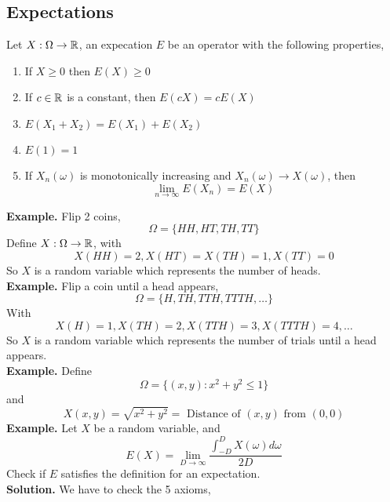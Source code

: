 \subsection{Expectations}
\begin{definition}
    
    Let $X: \Omega \to \mathbb{R}$, an expecation $E$ be an operator with the following properties, 
    \begin{enumerate}[label=(\roman*)]
        \item If $X \geq 0$ then $E(X) \geq 0$
        \item If $c \in \mathbb{R}$ is a constant, then $E(cX) = cE(X)$
        \item $E(X_1 + X_2) = E(X_1) + E(X_2)$
        \item $E(1) = 1$
        \item If $X_n(\omega)$ is monotonically increasing and $X_n(\omega) \rightarrow X(\omega)$, then 
        \[\lim_{n\rightarrow \infty} E(X_n) = E(X)\]
    \end{enumerate}
\end{definition}
\noindent
\textbf{Example.} Flip 2 coins, 
\[\Omega = \{HH, HT, TH, TT\}\]
Define $X: \Omega \rightarrow \mathbb{R}$, with 
\[X(HH) = 2, X(HT) = X(TH) = 1, X(TT) = 0\]
So $X$ is a random variable which represents the number of heads.\\[2ex]
\textbf{Example.} Flip a coin until a head appears, 
\[\Omega = \{H, TH, TTH, TTTH, \ldots\}\]
With 
\[X(H) = 1, X(TH) = 2, X(TTH) = 3, X(TTTH) = 4, \ldots\]
So $X$ is a random variable which represents the number of trials until a head appears.\\[2ex]
\textbf{Example.} Define 
\[\Omega = \{(x,y): x^2 + y^2 \leq 1\}\]
and 
\[X(x,y) = \sqrt{x^2 + y^2} = \text{ Distance of $(x,y)$ from $(0,0)$}\]
\textbf{Example.} Let $X$ be a random variable, and
\[E(X) = \lim_{D \rightarrow \infty} \frac{\int_{-D}^D X(\omega)d\omega}{2D}\]
Check if $E$ satisfies the definition for an expectation. \\[2ex]
\textbf{Solution.} We have to check the 5 axioms, 
